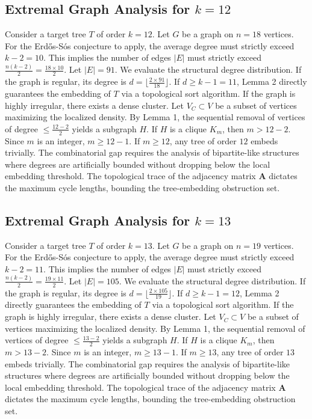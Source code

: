 \documentclass[11pt,a4paper]{article}
\begin{document}
\subsection{Extremal Graph Analysis for $k=12$}
Consider a target tree $T$ of order $k=12$.
Let $G$ be a graph on $n=18$ vertices.
For the Erd\H{o}s-S\'os conjecture to apply, the average degree must strictly exceed $k-2 = 10$.
This implies the number of edges $|E|$ must strictly exceed $\frac{n(k-2)}{2} = \frac{18 \times 10}{2}$.
Let $|E| = 91$.
We evaluate the structural degree distribution. If the graph is regular, its degree is $d = \lfloor \frac{2 \times 91}{18} \rfloor$.
If $d \geq k-1 = 11$, Lemma 2 directly guarantees the embedding of $T$ via a topological sort algorithm.
If the graph is highly irregular, there exists a dense cluster. Let $V_C \subset V$ be a subset of vertices maximizing the localized density.
By Lemma 1, the sequential removal of vertices of degree $\leq \frac{12-2}{2}$ yields a subgraph $H$.
If $H$ is a clique $K_{m}$, then $m > 12-2$. Since $m$ is an integer, $m \geq 12-1$. If $m \geq 12$, any tree of order $12$ embeds trivially.
The combinatorial gap requires the analysis of bipartite-like structures where degrees are artificially bounded without dropping below the local embedding threshold. The topological trace of the adjacency matrix $\mathbf{A}$ dictates the maximum cycle lengths, bounding the tree-embedding obstruction set.


\subsection{Extremal Graph Analysis for $k=13$}
Consider a target tree $T$ of order $k=13$.
Let $G$ be a graph on $n=19$ vertices.
For the Erd\H{o}s-S\'os conjecture to apply, the average degree must strictly exceed $k-2 = 11$.
This implies the number of edges $|E|$ must strictly exceed $\frac{n(k-2)}{2} = \frac{19 \times 11}{2}$.
Let $|E| = 105$.
We evaluate the structural degree distribution. If the graph is regular, its degree is $d = \lfloor \frac{2 \times 105}{19} \rfloor$.
If $d \geq k-1 = 12$, Lemma 2 directly guarantees the embedding of $T$ via a topological sort algorithm.
If the graph is highly irregular, there exists a dense cluster. Let $V_C \subset V$ be a subset of vertices maximizing the localized density.
By Lemma 1, the sequential removal of vertices of degree $\leq \frac{13-2}{2}$ yields a subgraph $H$.
If $H$ is a clique $K_{m}$, then $m > 13-2$. Since $m$ is an integer, $m \geq 13-1$. If $m \geq 13$, any tree of order $13$ embeds trivially.
The combinatorial gap requires the analysis of bipartite-like structures where degrees are artificially bounded without dropping below the local embedding threshold. The topological trace of the adjacency matrix $\mathbf{A}$ dictates the maximum cycle lengths, bounding the tree-embedding obstruction set.
\end{document}
